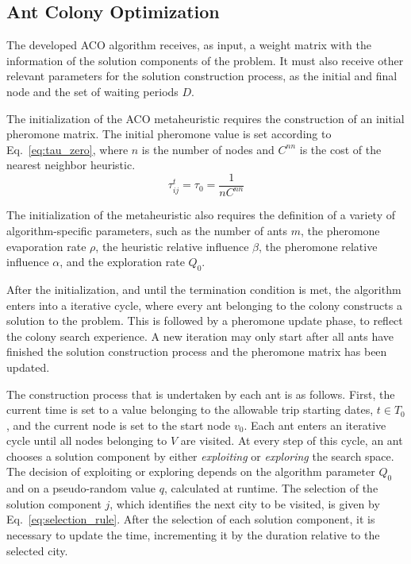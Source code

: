\documentclass[onecolumn]{elsarticle}
\begin{document}
\subsection{Ant Colony Optimization}

The developed ACO algorithm receives, as input, a weight matrix with the information of the solution components of the problem. It must also receive other relevant parameters for the solution construction process, as the initial and final node and the set of waiting periods $D$. 

The initialization of the ACO metaheuristic requires the construction of an initial pheromone matrix. The initial pheromone value is set according to Eq.~\ref{eq:tau_zero}, where $n$ is the number of nodes and $C^{nn}$ is the cost of the nearest neighbor heuristic. 
\begin{equation}
\label{eq:tau_zero}
  \tau_{ij}^{t} = \tau_{0} = \frac{1}{nC^{nn}}
\end{equation}

The initialization of the metaheuristic also requires the definition of a variety of algorithm-specific parameters, such as the number of ants $m$, the pheromone evaporation rate $\rho$, the heuristic relative influence $\beta$, the pheromone relative influence $\alpha$, and the exploration rate $Q_0$. 

After the initialization, and until the termination condition is met, the algorithm enters into a iterative cycle, where every ant belonging to the colony constructs a solution to the problem. This is followed by a pheromone update phase, to reflect the colony search experience. A new iteration may only start after all ants have finished the solution construction process and the pheromone matrix has been updated.

The construction process that is undertaken by each ant is as follows. First, the current time is set to a value belonging to the allowable trip starting dates, $t \in T_0$, and the current node is set to the start node $v_0$. Each ant enters an iterative cycle until all nodes belonging to $V$ are visited. At every step of this cycle, an ant chooses a solution component by either \textit{exploiting} or \textit{exploring} the search space. The decision of exploiting or exploring depends on the algorithm parameter $Q_0$ and on a pseudo-random value $q$, calculated at runtime. The selection of the solution component $j$, which identifies the next city to be visited, is given by Eq.~\ref{eq:selection_rule}. After the selection of each solution component, it is necessary to update the time, incrementing it by the duration relative to the selected city.
\end{document}
